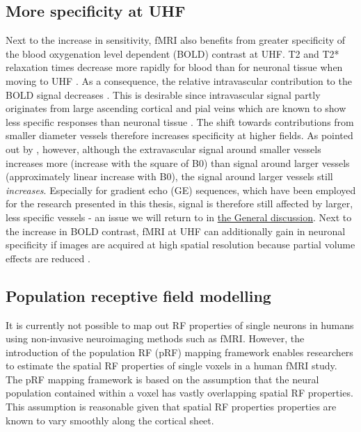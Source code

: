 \subsection{More specificity at UHF}
Next to the increase in sensitivity, fMRI also benefits from greater specificity of the blood oxygenation level dependent (BOLD) contrast at UHF. T2 and T2* relaxation times decrease more rapidly for blood than for neuronal tissue when moving to UHF \parencite{Ugurbil2002}. As a consequence, the relative intravascular contribution to the BOLD signal decreases \parencite{Uludag2009, Uludag2016}. This is desirable since intravascular signal partly originates from large ascending cortical and pial veins which are known to show less specific responses than neuronal tissue \parencite{DeMartino2016, Moerel2017}. The shift towards contributions from smaller diameter vessels therefore increases specificity at higher fields. As pointed out by \cite{DeMartino2016}, however, although the extravascular signal around smaller vessels increases more (increase with the square of B0) than signal around larger vessels (approximately linear increase with B0), the signal around larger vessels still \textit{increases}. Especially for gradient echo (GE) sequences, which have been employed for the research presented in this thesis, signal is therefore still affected by larger, less specific vessels - an issue we will return to in \hyperref[ch:chapter05]{the General discussion}. Next to the increase in BOLD contrast, fMRI at UHF can additionally gain in neuronal specificity if images are acquired at high spatial resolution because partial volume effects are reduced \parencite{DeMartino2016}.

\subsection{Population receptive field modelling}
It is currently not possible to map out RF properties of single neurons in humans using non-invasive neuroimaging methods such as fMRI. However, the introduction of the population RF (pRF) mapping framework \parencite{Dumoulin2008} enables researchers to estimate the spatial RF properties of single voxels in a human fMRI study. The pRF mapping framework is based on the assumption that the neural population contained within a voxel has vastly overlapping spatial RF properties. This assumption is reasonable given that spatial RF properties properties are known to vary smoothly along the cortical sheet.

